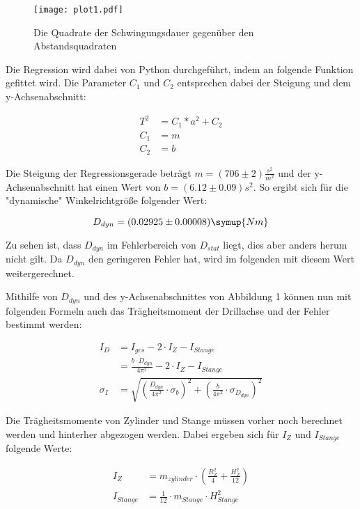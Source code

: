 \begin{figure}
  \texttt{[image: plot1.pdf]}
  \caption{Die Quadrate der Schwingungsdauer gegenüber den Abstandsquadraten}
\end{figure}

Die Regression wird dabei von Python durchgeführt, indem an folgende Funktion gefittet wird.
Die Parameter $C_1$ und $C_2$ entsprechen dabei der Steigung und dem y-Achsenabschnitt:

\begin{align}
  T^2 &= C_1 * a^2 + C_2 \\
  C_1 &= m \\
  C_2 &= b
\end{align}

Die Steigung der Regressionsgerade beträgt $m = (706 \pm 2) \frac{s^2}{m^2}$ und
der y-Achsenabschnitt hat einen Wert von $b = (6.12 \pm 0.09) s^2$. So ergibt sich für
die "dynamische" Winkelrichtgröße folgender Wert:

\begin{equation}
  D_{dyn} = (0.02925 \pm 0.00008) \symup{Nm}
\end{equation}

Zu sehen ist, dass $D_{dyn}$ im Fehlerbereich von $D_{stat}$ liegt, dies aber anders herum nicht
gilt. Da $D_{dyn}$ den geringeren Fehler hat, wird im folgenden mit diesem Wert weitergerechnet.

Mithilfe von $D_{dyn}$ und des y-Achsenabschnittes von Abbildung 1 können nun mit folgenden Formeln
auch das Trägheitsmoment der Drillachse und der Fehler bestimmt werden:

\begin{align}
  I_D        &= I_{ges} - 2 \cdot I_{Z} - I_{Stange}\\
             &= \frac{b \cdot D_{dyn}}{4 \pi^2} - 2 \cdot I_{Z} - I_{Stange}\\
  \sigma_I   &= \sqrt{ \left( \frac{D_{dyn}}{4\pi^2} \cdot \sigma_b \right) ^2 + \left( \frac{b}{4\pi^2} \cdot \sigma_{D_{dyn}} \right) ^2}
\end{align}

Die Trägheitsmomente von Zylinder und Stange müssen vorher noch berechnet werden und hinterher abgezogen werden.
Dabei ergeben sich für $I_{Z}$ und $I_{Stange}$ folgende Werte:

\begin{align}
  I_Z        &= m_{zylinder} \cdot \left( \frac{R_Z^2}{4} + \frac{H_Z^2}{12} \right)\\
  I_{Stange} &= \frac{1}{12} \cdot m_{Stange} \cdot H_{Stange}^2
\end{align}


